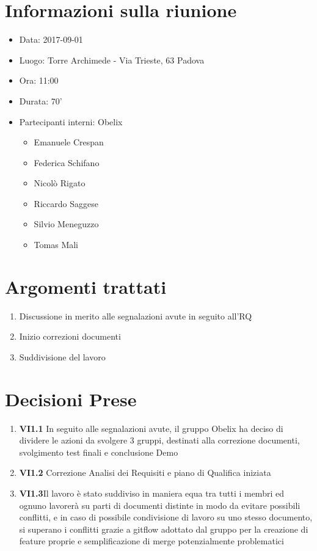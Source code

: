 \documentclass[10 pt,a4paper, openany]{article}
\date{}
\begin{document}
\paginatitolo
\section{Informazioni sulla riunione}

\begin{itemize}
\item[] Data: 2017-09-01
\item[] Luogo: Torre Archimede - Via Trieste, 63 Padova
\item[] Ora: 11:00
\item[] Durata: 70'
\item[] Partecipanti interni: Obelix
  \begin{itemize}
  \item[] Emanuele Crespan
  \item[] Federica Schifano
  \item[] Nicolò Rigato
  \item[] Riccardo Saggese
  \item[] Silvio Meneguzzo
  \item[] Tomas Mali
 \end{itemize}
\end{itemize}

\section{Argomenti trattati}
\begin{enumerate}
	\item Discussione in merito alle segnalazioni avute in seguito all'RQ
	\item Inizio correzioni documenti 
	\item Suddivisione del lavoro
\end{enumerate}

\section{Decisioni Prese}
\begin{enumerate}
	\item \textbf{VI1.1} In seguito alle segnalazioni avute, il gruppo Obelix ha deciso di dividere le azioni da svolgere 3 gruppi, destinati alla correzione documenti, svolgimento test finali e conclusione Demo
	\item \textbf{VI1.2} Correzione Analisi dei Requisiti e piano di Qualifica iniziata 
		
			

	\item \textbf{VI1.3}Il lavoro è stato suddiviso in maniera equa tra tutti i membri ed ognuno lavorerà su parti di documenti distinte in modo da evitare possibili conflitti, e in caso di possibile condivisione di lavoro su uno stesso documento, si superano i conflitti grazie a gitflow adottato dal gruppo per la creazione di feature proprie e semplificazione di merge potenzialmente problematici 
	
	
\end{enumerate}
\end{document}
